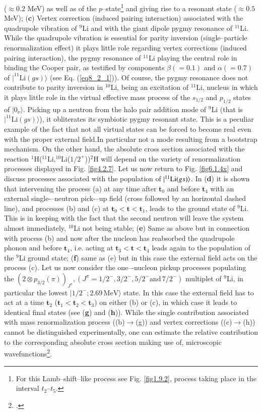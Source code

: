 ($\approx 0.2$ MeV) as well as of the $p$--state\footnote{For this Lamb--shift--like process see Fig. \ref{fig1.9.2}, process taking place in the interval $t_2$--$t_5$.} and giving rise to a resonant state ($\approx0.5$ MeV);  (\textbf{c}) Vertex correction (induced pairing interaction) associated with the quadrupole vibration of $^9$Li and with the giant dipole pygmy resonance of $^{11}$Li. While the quadrupole vibration is essential for parity inversion (single--particle renormalization effect) it plays little role regarding vertex corrections (induced pairing interaction), the pygmy resonance of $^{11}$Li playing the central role in binding the Cooper pair, as testified by components $\beta(=0.1)$ and $\alpha(=0.7)$ of $|^{11}\text{Li}(gs)\rangle$ (see Eq. (\ref{eq8_2_1})). Of course, the pygmy resonance does not contribute to parity inversion in $^{10}$Li, being an excitation of $^{11}$Li, nucleus in which it plays little role in the virtual effective mass process of the $s_{1/2}$ and $p_{1/2}$ states of $|0_\nu\rangle$. Picking up a neutron from the halo pair addition mode of $^9$Li (that is $|^{11}\text{Li}(gs)\rangle$), it obliterates its symbiotic pygmy resonant state. This is  a peculiar example of the fact that not all virtual states can be forced to become real even with the proper external field.In particular not a mode resulting from a bootstrap mechanism. On the other hand, the absolute cross section associated with the reaction  $^1$H($^{11}$Li,$^{10}$Li($1/2^+$))$^2$H will depend on the variety of renormalization processes displayed in Fig. \ref{fig4.2.7}.  Let us now return to Fig. \ref{fig6.1.4x} and discuss processes associated with the population of $|{^{11}\text{Li}(gs)} \rangle$. In (\textbf{d}) it is shown that intervening the process (a) at any time after
$\mathbf{t}_0$ and before $\mathbf{t}_4$ with an external single-–neutron pick-–up field (cross followed by an horizontal dashed line), and processes (b) and (c) at $\mathbf{t}_0<\mathbf{t}<\mathbf{t}_1$, 
 leads to the ground state of $^9$Li. This is in keeping with the fact that the second neutron will leave the system
almost immediately, $^{10}$Li not being stable; (\textbf{e}) Same as above but in connection with process (b) and now after the nucleon has reabsorbed
the quadrupole phonon and before $\mathbf{t}_4$, i.e. acting at $\mathbf{t}_3<\mathbf{t}<\mathbf{t}_4$ leads again to the population of the $^9$Li ground state; (\textbf{f}) same as (e) but in this case the external field acts on the process (c). Let us now consider
the one–-nucleon pickup processes populating the $(2\otimes p_{3/2}(\pi))_{J^{\pi}}, (J^{\pi}=1/2^-,3/2^-,5/2^-\text{and}\, 7/2^-)$ multiplet of $^9$Li, in particular the lowest
$|1/2^-;2.69\, \text{MeV}\rangle$ state. In this case the external field has to act at a time $\mathbf{t}_2$ ($\mathbf t_1<\mathbf t_2<\mathbf t_3$) on either (b) or (c), in which case it leads to identical final states (see (\textbf{g}) and  (\textbf{h})). While
the single contribution associated with mass renormalization process ((b)$\rightarrow$(g)) and vertex corrections ((c)$\rightarrow$(h)) cannot be 
distinguished experimentally, one can estimate the relative contribution to the corresponding absolute cross section making use of, microscopic wavefunctions\footnote{\cite{Barranco:01}.}.


